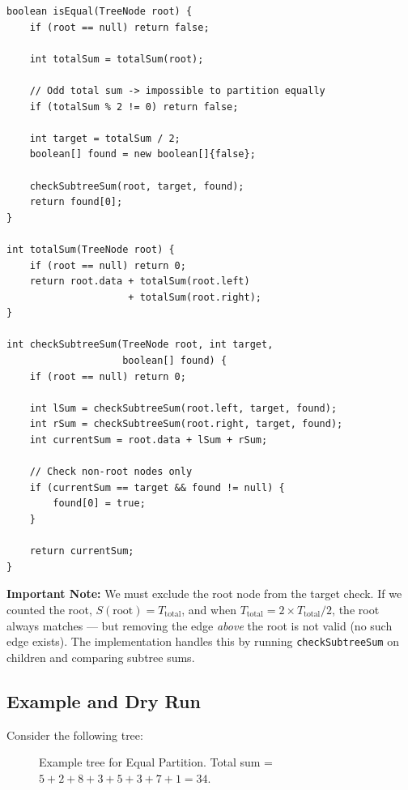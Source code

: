 \documentclass[10pt,journal,compsoc,onecolumn]{IEEEtran}
\begin{document}
\begin{verbatim}
boolean isEqual(TreeNode root) {
    if (root == null) return false;
    
    int totalSum = totalSum(root);
    
    // Odd total sum -> impossible to partition equally
    if (totalSum % 2 != 0) return false;
    
    int target = totalSum / 2;
    boolean[] found = new boolean[]{false};
    
    checkSubtreeSum(root, target, found);
    return found[0];
}

int totalSum(TreeNode root) {
    if (root == null) return 0;
    return root.data + totalSum(root.left) 
                     + totalSum(root.right);
}

int checkSubtreeSum(TreeNode root, int target,
                    boolean[] found) {
    if (root == null) return 0;
    
    int lSum = checkSubtreeSum(root.left, target, found);
    int rSum = checkSubtreeSum(root.right, target, found);
    int currentSum = root.data + lSum + rSum;
    
    // Check non-root nodes only
    if (currentSum == target && found != null) {
        found[0] = true;
    }
    
    return currentSum;
}
\end{verbatim}

\textbf{Important Note:} We must exclude the root node from the target check. If we counted the root, $S(\text{root}) = T_{\text{total}}$, and when $T_{\text{total}} = 2 \times T_{\text{total}}/2$, the root always matches --- but removing the edge \emph{above} the root is not valid (no such edge exists). The implementation handles this by running \texttt{checkSubtreeSum} on children and comparing subtree sums.

\subsection{Example and Dry Run}

Consider the following tree:

\begin{figure}[htbp]
\centering
{}
\caption{Example tree for Equal Partition. Total sum = $5+2+8+3+5+3+7+1 = 34$.}
\end{figure}
\end{document}
